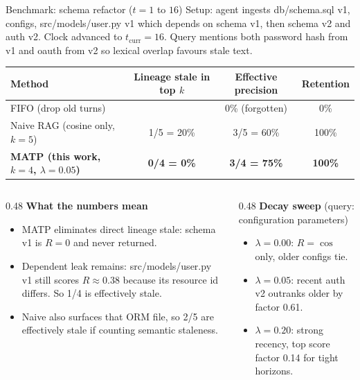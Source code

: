 \documentclass[aspectratio=169,10pt]{beamer}
\begin{document}
\begin{frame}{Benchmark: schema refactor ($t=1$ to $16$)}
  {\footnotesize Setup: agent ingests db/schema.sql v1, configs, src/models/user.py v1 which depends on schema v1, then schema v2 and auth v2. Clock advanced to $t_{\mathrm{curr}}=16$. Query mentions both password hash from v1 and oauth from v2 so lexical overlap favours stale text.}

  \vspace{0.4em}
  \begin{table}
    \centering
    \footnotesize
    \begin{tabular}{lccc}
      \toprule
      Method & Lineage stale in top $k$ & Effective precision & Retention\\
      \midrule
      FIFO (drop old turns) & & 0\% (forgotten) & 0\%\\
      Naive RAG (cosine only, $k=5$) & 1/5 = 20\% & 3/5 = 60\% & 100\%\\
      \textbf{MATP (this work, $k=4$, $\lambda=0.05$)} & \textbf{0/4 = 0\%} & \textbf{3/4 = 75\%} & \textbf{100\%}\\
      \bottomrule
    \end{tabular}
  \end{table}

  \begin{columns}[T,onlytextwidth]
    \begin{column}{0.48\textwidth}
      {\footnotesize \textbf{What the numbers mean}}
      \begin{itemize}
        \footnotesize
        \item MATP eliminates direct lineage stale: schema v1 is $R=0$ and never returned.
        \item Dependent leak remains: src/models/user.py v1 still scores $R\approx0.38$ because its resource id differs. So 1/4 is effectively stale.
        \item Naive also surfaces that ORM file, so 2/5 are effectively stale if counting semantic staleness.
      \end{itemize}
    \end{column}
    \begin{column}{0.48\textwidth}
      {\footnotesize \textbf{Decay sweep} (query: configuration parameters)}
      \begin{itemize}
        \footnotesize
        \item $\lambda=0.00$: $R=\cos$ only, older configs tie.
        \item $\lambda=0.05$: recent auth v2 outranks older by factor 0.61.
        \item $\lambda=0.20$: strong recency, top score factor 0.14 for tight horizons.
      \end{itemize}
    \end{column}
  \end{columns}
\end{frame}
\end{document}
